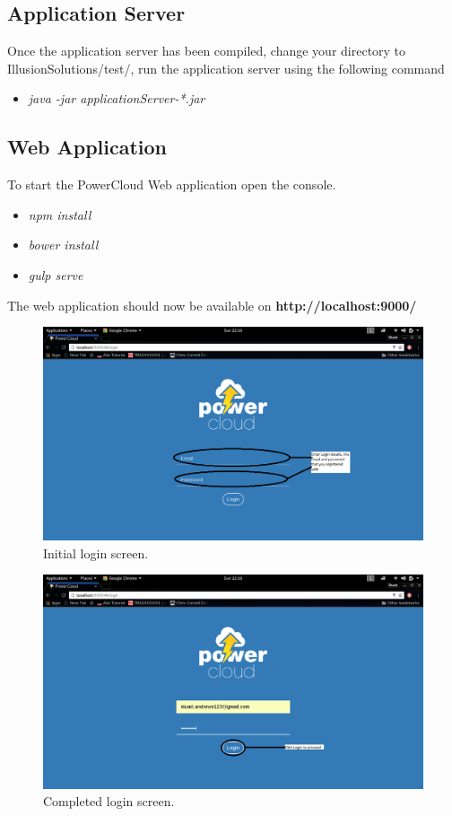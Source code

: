\documentclass[a4paper,10pt]{article}
\begin{document}
	\subsection{Application Server}
	Once the application server has been compiled, change your directory to IllusionSolutions/test/, run the application server using the following command
	
	\begin{itemize}
		\item \textit{java -jar applicationServer-*.jar}
	\end{itemize}
	
	\subsection{Web Application}
	To start the PowerCloud Web application open the console.
	
	\begin{itemize}
		\item \textit{npm install}
		\item \textit{bower install}
		\item \textit{gulp serve}
	\end{itemize}
	
	The web application should now be available on \textbf{http://localhost:9000/}
	
	\begin{figure}[H]
		\includegraphics[width=\textwidth]{images/login.png}
		\caption{Initial login screen. \label{overflow}}
	\end{figure}
	
	\begin{figure}[H]
		\includegraphics[width=\textwidth]{images/login2.png}
		\caption{Completed login screen. \label{overflow}}
	\end{figure}
	
\end{document}
